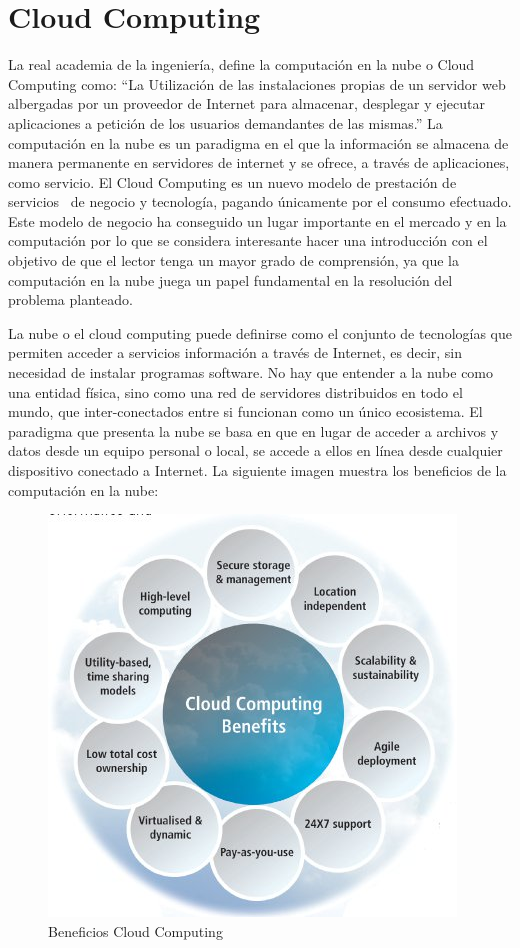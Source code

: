 \documentclass[a4paper,11pt]{book}
\begin{document}
\section{Cloud Computing}

La real academia de la ingeniería, define la computación en la nube o Cloud Computing\citep{realacademia}  como: “La Utilización de las instalaciones propias de un servidor web albergadas por un proveedor de Internet para almacenar, desplegar y ejecutar aplicaciones a petición de los usuarios demandantes de las mismas.” La computación en la nube es un paradigma en el que la información se almacena de manera permanente en servidores de internet y se ofrece, a través de aplicaciones, como servicio. El Cloud Computing es un nuevo modelo de prestación de servicios~\cite{magazine} de negocio y tecnología, pagando únicamente por el consumo efectuado. Este modelo de negocio ha conseguido un lugar importante en el mercado y en la computación  por lo que se considera  interesante hacer una introducción con el objetivo de que el lector tenga un mayor grado de comprensión, ya que la computación en la nube juega un papel fundamental en la resolución  del problema planteado.

La nube  o el cloud computing  puede definirse  como el conjunto de tecnologías que permiten acceder a servicios información a través de Internet, es decir, sin necesidad de instalar programas software. No hay que entender a la nube como una entidad física, sino como una red de servidores distribuidos en todo el mundo, que inter-conectados entre si funcionan como un único ecosistema.  El paradigma que presenta la nube se basa en que en lugar de acceder a archivos y datos desde un equipo personal o local, se accede a ellos en línea desde cualquier dispositivo conectado a Internet. La siguiente imagen muestra los beneficios de la computación en la nube:

\begin{figure}[H]
\centering
\includegraphics[scale=0.5]{imagenes/beneficiosCC.jpg}
\caption{ Beneficios Cloud Computing~\cite{beneficios} }
\end{figure}
\end{document}
